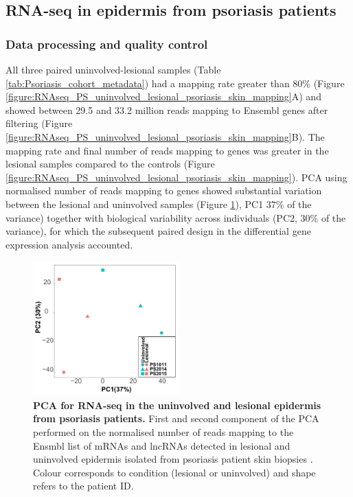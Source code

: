 

\subsection{RNA-seq in epidermis from psoriasis patients}

\subsubsection{Data processing and quality control}
All three paired uninvolved-lesional samples (Table \ref{tab:Psoriasis_cohort_metadata}) had a mapping rate greater than 80\% (Figure \ref{figure:RNAseq_PS_uninvolved_lesional_psoriasis_skin_mapping}A) and showed between 29.5 and 33.2 million reads mapping to Ensembl genes after filtering (Figure \ref{figure:RNAseq_PS_uninvolved_lesional_psoriasis_skin_mapping}B). The mapping rate and final number of reads mapping to genes was greater in the lesional samples compared to the controls (Figure \ref{figure:RNAseq_PS_uninvolved_lesional_psoriasis_skin_mapping}). PCA using normalised number of reads mapping to genes showed substantial variation between the lesional and uninvolved samples (Figure \ref{figure:RNAseq_PS_lesional_uninvolved_PCA}), PC1 37\% of the variance) together with biological variability across individuals (PC2, 30\% of the variance), for which the subsequent paired design in the differential gene expression analysis accounted.  


\begin{figure}[htbp]
\centering
\includegraphics[width=0.5\textwidth]{./Results2/pdfs/PS_lesional_uninvolved_varied_PCA1and2_plot}
\caption[PCA for RNA-seq in the uninvolved and lesional epidermis from psoriasis patients.]{\textbf{PCA for RNA-seq in the uninvolved and lesional epidermis from psoriasis patients.} First and second component of the PCA performed on the normalised number of reads mapping to the Ensmbl list of mRNAs and lncRNAs detected in lesional and uninvolved epidermis isolated from psoriasis patient skin biopsies . Colour corresponds to condition (lesional or uninvolved) and shape refers to the patient ID.}
\label{figure:RNAseq_PS_lesional_uninvolved_PCA}
\end{figure}




